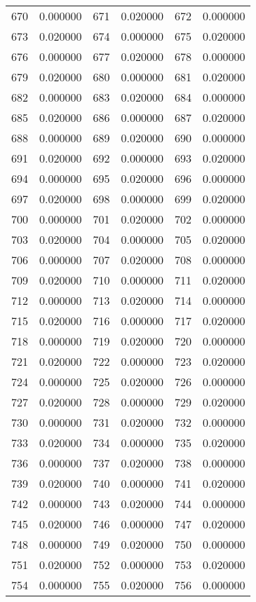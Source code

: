 \documentclass[12pt]{article}
\begin{document}
\begin{longtable}{@{}cc|cc|cc@{}}
670 & 0.000000 & 671 & 0.020000 & 672 & 0.000000 \\
673 & 0.020000 & 674 & 0.000000 & 675 & 0.020000 \\
676 & 0.000000 & 677 & 0.020000 & 678 & 0.000000 \\
679 & 0.020000 & 680 & 0.000000 & 681 & 0.020000 \\
682 & 0.000000 & 683 & 0.020000 & 684 & 0.000000 \\
685 & 0.020000 & 686 & 0.000000 & 687 & 0.020000 \\
688 & 0.000000 & 689 & 0.020000 & 690 & 0.000000 \\
691 & 0.020000 & 692 & 0.000000 & 693 & 0.020000 \\
694 & 0.000000 & 695 & 0.020000 & 696 & 0.000000 \\
697 & 0.020000 & 698 & 0.000000 & 699 & 0.020000 \\
700 & 0.000000 & 701 & 0.020000 & 702 & 0.000000 \\
703 & 0.020000 & 704 & 0.000000 & 705 & 0.020000 \\
706 & 0.000000 & 707 & 0.020000 & 708 & 0.000000 \\
709 & 0.020000 & 710 & 0.000000 & 711 & 0.020000 \\
712 & 0.000000 & 713 & 0.020000 & 714 & 0.000000 \\
715 & 0.020000 & 716 & 0.000000 & 717 & 0.020000 \\
718 & 0.000000 & 719 & 0.020000 & 720 & 0.000000 \\
721 & 0.020000 & 722 & 0.000000 & 723 & 0.020000 \\
724 & 0.000000 & 725 & 0.020000 & 726 & 0.000000 \\
727 & 0.020000 & 728 & 0.000000 & 729 & 0.020000 \\
730 & 0.000000 & 731 & 0.020000 & 732 & 0.000000 \\
733 & 0.020000 & 734 & 0.000000 & 735 & 0.020000 \\
736 & 0.000000 & 737 & 0.020000 & 738 & 0.000000 \\
739 & 0.020000 & 740 & 0.000000 & 741 & 0.020000 \\
742 & 0.000000 & 743 & 0.020000 & 744 & 0.000000 \\
745 & 0.020000 & 746 & 0.000000 & 747 & 0.020000 \\
748 & 0.000000 & 749 & 0.020000 & 750 & 0.000000 \\
751 & 0.020000 & 752 & 0.000000 & 753 & 0.020000 \\
754 & 0.000000 & 755 & 0.020000 & 756 & 0.000000 \\

\end{longtable}
\end{document}
